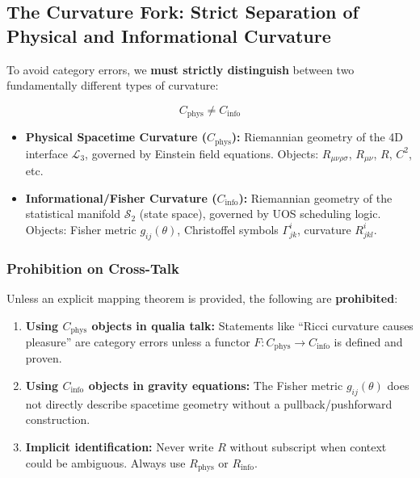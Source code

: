 \documentclass[11pt,titlepage]{article}
\begin{document}
\subsection{The Curvature Fork: Strict Separation of Physical and Informational Curvature}
\label{sec:curvature-fork-strict}

\begin{tcolorbox}[colback=red!5!white,colframe=red!75!black,title=Critical Distinction (Enforced Throughout)]
To avoid category errors, we \textbf{must strictly distinguish} between two fundamentally different types of curvature:

\[
\boxed{C_{\mathrm{phys}} \neq C_{\mathrm{info}}}
\]

\begin{itemize}
\item \textbf{Physical Spacetime Curvature ($C_{\mathrm{phys}}$):} Riemannian geometry of the 4D interface $\mathcal{L}_3$, governed by Einstein field equations. Objects: $R_{\mu\nu\rho\sigma}$, $R_{\mu\nu}$, $R$, $C^2$, etc.

\item \textbf{Informational/Fisher Curvature ($C_{\mathrm{info}}$):} Riemannian geometry of the statistical manifold $\mathcal{S}_2$ (state space), governed by UOS scheduling logic. Objects: Fisher metric $g_{ij}(\theta)$, Christoffel symbols $\Gamma^i_{jk}$, curvature $R^i_{jkl}$.
\end{itemize}
\end{tcolorbox}

\subsubsection{Prohibition on Cross-Talk}
Unless an explicit mapping theorem is provided, the following are \textbf{prohibited}:

\begin{enumerate}
\item \textbf{Using $C_{\mathrm{phys}}$ objects in qualia talk:} Statements like ``Ricci curvature causes pleasure'' are category errors unless a functor $F: C_{\mathrm{phys}} \to C_{\mathrm{info}}$ is defined and proven.

\item \textbf{Using $C_{\mathrm{info}}$ objects in gravity equations:} The Fisher metric $g_{ij}(\theta)$ does not directly describe spacetime geometry without a pullback/pushforward construction.

\item \textbf{Implicit identification:} Never write $R$ without subscript when context could be ambiguous. Always use $R_{\mathrm{phys}}$ or $R_{\mathrm{info}}$.
\end{enumerate}
\end{document}
